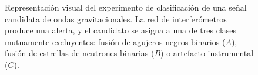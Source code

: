\begin{figure}[htbp]
\caption{Representación visual del experimento de clasificación de una señal candidata de ondas gravitacionales. La red de interferómetros produce una alerta, y el candidato se asigna a una de tres clases mutuamente excluyentes: fusión de agujeros negros binarios ($A$), fusión de estrellas de neutrones binarias ($B$) o artefacto instrumental ($C$).}
\end{figure}
